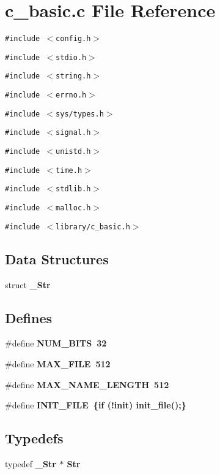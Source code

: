 \section{c\_\-basic.c File Reference}
\label{c__basic_8c}
{\tt \#include $<$config.h$>$}\par
{\tt \#include $<$stdio.h$>$}\par
{\tt \#include $<$string.h$>$}\par
{\tt \#include $<$errno.h$>$}\par
{\tt \#include $<$sys/types.h$>$}\par
{\tt \#include $<$signal.h$>$}\par
{\tt \#include $<$unistd.h$>$}\par
{\tt \#include $<$time.h$>$}\par
{\tt \#include $<$stdlib.h$>$}\par
{\tt \#include $<$malloc.h$>$}\par
{\tt \#include $<$library/c\_\-basic.h$>$}\par
\subsection*{Data Structures}
\begin{CompactItemize}
\item 
struct \bf{\_\-Str}
\end{CompactItemize}
\subsection*{Defines}
\begin{CompactItemize}
\item 
\#define \bf{NUM\_\-BITS}~32
\item 
\#define \bf{MAX\_\-FILE}~512
\item 
\#define \bf{MAX\_\-NAME\_\-LENGTH}~512
\item 
\#define \bf{INIT\_\-FILE}~\{if (!\bf{init}) init\_\-file();\}
\end{CompactItemize}
\subsection*{Typedefs}
\begin{CompactItemize}
\item 
typedef \bf{\_\-Str} $\ast$ \bf{Str}
\end{CompactItemize}
